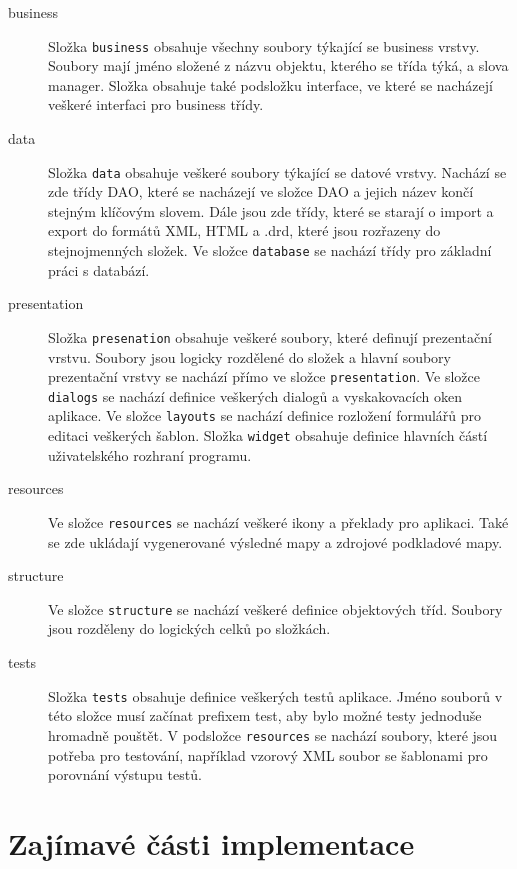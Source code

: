 \documentclass[thesis=B,czech]{resources/FITthesis}[2012/06/26]
\begin{document}
\begin{description}
\item[business] Složka \texttt{business} obsahuje všechny soubory týkající se business vrstvy. Soubory mají jméno složené z názvu objektu, kterého se třída týká, a slova manager. Složka obsahuje také podsložku interface, ve které se nacházejí veškeré interfaci pro business třídy.

\item[data] Složka \texttt{data} obsahuje veškeré soubory týkající se datové vrstvy. Nachází se zde třídy DAO, které se nacházejí ve složce DAO a jejich název končí stejným klíčovým slovem. Dále jsou zde třídy, které se starají o import a export do formátů XML, HTML a .drd, které jsou rozřazeny do stejnojmenných složek. Ve složce \texttt{database} se nachází třídy pro základní práci s databází.

\item[presentation]Složka \texttt{presenation} obsahuje veškeré soubory, které definují prezentační vrstvu. Soubory jsou logicky rozdělené do složek a hlavní soubory prezentační vrstvy se nachází přímo ve složce \texttt{presentation}. Ve složce \texttt{dialogs} se nachází definice veškerých dialogů a vyskakovacích oken aplikace. Ve složce \texttt{layouts} se nachází definice rozložení formulářů pro editaci veškerých šablon. Složka \texttt{widget} obsahuje definice hlavních částí uživatelského rozhraní programu.

\item[resources] Ve složce \texttt{resources} se nachází veškeré ikony a překlady pro aplikaci. Také se zde ukládají vygenerované výsledné mapy a zdrojové podkladové mapy.

\item[structure] Ve složce \texttt{structure} se nachází veškeré definice objektových tříd. Soubory jsou rozděleny do logických celků po složkách.

\item[tests] Složka \texttt{tests} obsahuje definice veškerých testů aplikace. Jméno souborů v této složce musí začínat prefixem test, aby bylo možné testy jednoduše hromadně pouštět. V podsložce \texttt{resources} se nachází soubory, které jsou potřeba pro testování, například vzorový XML soubor se šablonami pro porovnání výstupu testů.
\end{description}

\section{Zajímavé části implementace}
\end{document}
